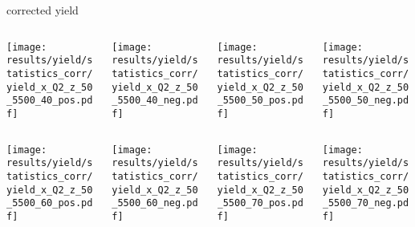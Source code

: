 \begin{frame}{corrected yield}
\begin{columns}
\begin{column}[T]{0.25\textwidth}
\texttt{[image: results/yield/statistics\_corr/yield\_x\_Q2\_z\_50\_5500\_40\_pos.pdf]}
\end{column}
\begin{column}[T]{0.25\textwidth}
\texttt{[image: results/yield/statistics\_corr/yield\_x\_Q2\_z\_50\_5500\_40\_neg.pdf]}
\end{column}
\begin{column}[T]{0.25\textwidth}
\texttt{[image: results/yield/statistics\_corr/yield\_x\_Q2\_z\_50\_5500\_50\_pos.pdf]}
\end{column}
\begin{column}[T]{0.25\textwidth}
\texttt{[image: results/yield/statistics\_corr/yield\_x\_Q2\_z\_50\_5500\_50\_neg.pdf]}
\end{column}
\end{columns}
\begin{columns}
\begin{column}[T]{0.25\textwidth}
\texttt{[image: results/yield/statistics\_corr/yield\_x\_Q2\_z\_50\_5500\_60\_pos.pdf]}
\end{column}
\begin{column}[T]{0.25\textwidth}
\texttt{[image: results/yield/statistics\_corr/yield\_x\_Q2\_z\_50\_5500\_60\_neg.pdf]}
\end{column}
\begin{column}[T]{0.25\textwidth}
\texttt{[image: results/yield/statistics\_corr/yield\_x\_Q2\_z\_50\_5500\_70\_pos.pdf]}
\end{column}
\begin{column}[T]{0.25\textwidth}
\texttt{[image: results/yield/statistics\_corr/yield\_x\_Q2\_z\_50\_5500\_70\_neg.pdf]}
\end{column}
\end{columns}
\end{frame}
